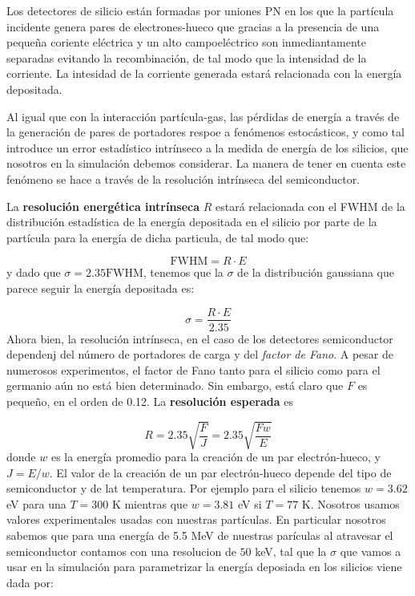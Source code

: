 Los detectores de silicio están formadas por uniones PN en los que la partícula incidente genera pares de electrones-hueco que gracias a la presencia de una pequeña coriente eléctrica y un alto campoeléctrico son inmediantamente separadas evitando la recombinación, de tal modo que la intensidad de la corriente. La intesidad de la corriente generada estará relacionada con la energía depositada.

Al igual que con la interacción partícula-gas, las pérdidas de energía a través de la generación de pares de portadores respoe a fenómenos estocásticos, y como tal introduce un error estadístico intrínseco a la medida de energía de los silicios, que nosotros en la simulación debemos considerar. La manera de tener en cuenta este fenómeno se hace a través de la resolución intrínseca del semiconductor.


La \textbf{resolución energética intrínseca} $R$ estará relacionada con el FWHM de la distribución estadística de la energía depositada en el silicio por parte de la partícula para la energía de dicha particula, de tal modo que:

\begin{equation}
	\text{FWHM} = R \cdot E
\end{equation}
y dado que $\sigma = 2.35 \text{FWHM} $, tenemos que la $\sigma$ de la distribución gaussiana que parece seguir la energía depositada es:

\begin{equation}
	\sigma  = \frac{R \cdot E}{2.35}
\end{equation}
Ahora bien, la resolución intrínseca, en el caso de los detectores semiconductor dependenj del número de portadores de carga y del \textit{factor de Fano}. A pesar de numerosos experimentos, el factor de Fano tanto para el silicio como para el germanio aún no está bien determinado. Sin embargo, está claro que \( F \) es pequeño, en el orden de 0{.}12. La \textbf{resolución esperada} es \cite{Leo:302344}

\begin{equation}
	R = 2.35 \sqrt{\frac{F}{J}} = 2.35 \sqrt{\frac{F w}{E}}
\end{equation}
donde \( w \) es la energía promedio para la creación de un par electrón-hueco, y \( J = E/w \). El valor de la creación de un par electrón-hueco depende del tipo de semiconductor y de lat temperatura. Por ejemplo para el silicio tenemos $w=3.62$ eV para una $T=$300 K mientras que $w=3.81$ eV si $T=77$ K. Nosotros usamos valores experimentales usadas con nuestras partículas. En particular nosotros sabemos que para una energía de 5.5 MeV de nuestras parículas al atravesar el semiconductor contamos con una resolucion de $50$ keV, tal que la $\sigma$ que vamos a usar en la simulación para parametrizar la energía deposiada en los silicios viene dada por:

